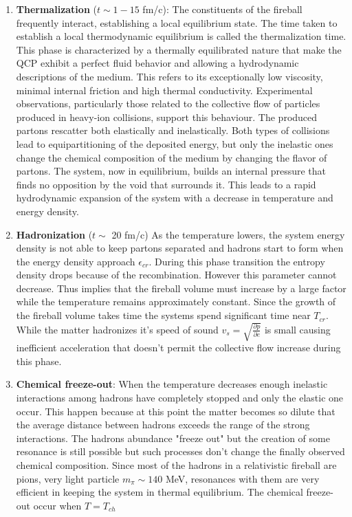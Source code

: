 \documentclass[12pt,a4paper]{book}
\begin{document}
\begin{enumerate}
		\item  \textbf{Thermalization} ($t \sim 1 - 15$ fm/c): The constituents of the fireball frequently interact, establishing a local equilibrium state. The time taken to establish a local thermodynamic equilibrium is called the thermalization time. This phase is characterized by a thermally equilibrated nature that make the QCP exhibit a perfect fluid behavior and allowing a hydrodynamic descriptions of the medium.  This refers to its exceptionally low viscosity, minimal internal friction and high thermal conductivity. Experimental observations, particularly those related to the collective flow of particles produced in heavy-ion collisions, support this behaviour. The produced partons rescatter both elastically and inelastically. Both types of collisions lead to equipartitioning of the deposited energy, but only the inelastic ones change the chemical composition of the medium by changing the flavor of partons. The system, now in equilibrium, builds an internal pressure that finds no opposition by the void that surrounds it. This leads to a rapid hydrodynamic expansion of the system  with a decrease in temperature and energy density. 
		
		\item \textbf{Hadronization} ($t \sim$ 20 fm/c) As the temperature lowers, the system energy density is not able to keep partons separated and hadrons start to form when the energy density approach $\epsilon_{cr}$. During this phase transition the entropy density drops because of the recombination. However this parameter cannot decrease. Thus implies that the fireball volume must increase by a large factor while the temperature remains approximately constant. Since the growth of the fireball volume takes time the systems spend significant time near $T_{cr}$. While the matter hadronizes it's speed of sound $v_s=\sqrt{\frac{\partial p}{\partial e}}$ is small causing inefficient acceleration that doesn't permit the collective flow increase during this phase.
		
		\item \textbf{Chemical freeze-out}: When the temperature decreases enough inelastic interactions among hadrons have completely stopped and only the elastic one occur. This happen because at this point the matter becomes so dilute that the average distance between hadrons exceeds the range of the strong interactions. The hadrons abundance "freeze out" but the creation of some resonance is still possible but such processes don’t change the finally observed chemical composition. Since most of the hadrons in a relativistic fireball are pions, very light particle $m_\pi \sim 140$ MeV, resonances with them are very efficient in keeping the system in thermal equilibrium. The chemical freeze-out occur when $T= T_{ch}$
		

\end{enumerate}
\end{document}
